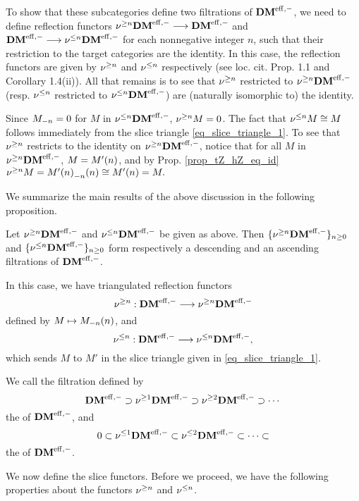 To show that these subcategories define two filtrations of 
$\DMeff$, we need to define reflection functors $\sgDM{n}\DMeff 
\to \DMeff$ and $\DMeff \to \slDM{n}\DMeff$ for each nonnegative 
integer $n$, such that their restriction to the target categories 
are the identity. In this case, the reflection functors are given 
by $\sgDM{n}$ and $\slDM{n}$ respectively (see loc. cit. Prop. 1.1 
and Corollary 1.4(ii)). All that remains is to see that $\sgDM{n}$ 
restricted to $\sgDM{n}\DMeff$ (resp. $\slDM{n}$ restricted to 
$\slDM{n}\DMeff$) are (naturally isomorphic to) the identity.

Since $\hZ[n]{M} = 0$ for $M$ in $\slDM{n}\DMeff$, $\sgDM{n} M = 
0$. The fact that $\slDM{n} M \cong M$ follows immediately from 
the slice triangle \eqref{eq_slice_triangle_1}. To see that 
$\sgDM{n}$ restricts to the identity on $\sgDM{n} \DMeff$, notice 
that for all $M$ in $\sgDM{n} \DMeff$, $M = \tZ[n]{M'}$, and by 
Prop. \ref{prop_tZ_hZ_eq_id} $\sgDM{n}M = 
\tZ[n]{\hZ[n]{\tZ[n]{M'}}} \cong \tZ[n]{M'} = M.$

We summarize the main results of the above discussion in the 
following proposition.

\begin{prop}\label{prop_slice_DMeff}
Let $\sgDM{n} \DMeff$ and $\slDM{n} \DMeff$ be given as above.
Then $\{\sgDM{n} \DMeff\}_{n \geq 0}$ and $\{\slDM{n} \DMeff\}_{n 
\geq 0}$ form respectively a descending and an ascending 
filtrations of $\DMeff$.

In this case, we have triangulated reflection functors 
\[
\sgDM{n}: \DMeff \to \sgDM{n}\DMeff
\] 
defined by $M \mapsto \tZ[n]{\hZ[n]{M}}$, and 
\[
\slDM{n}: \DMeff \to \slDM{n}\DMeff,
\]
which sends $M$ to $M'$ in the slice triangle given in 
\eqref{eq_slice_triangle_1}.
\end{prop}

\begin{defn}
We call the filtration defined by
\[
\DMeff \supset \sgDM{1}\DMeff \supset \sgDM{2}\DMeff \supset \cdots \\
\]
the  of $\DMeff$, and
\[
0 \subset \slDM{1}\DMeff \subset \slDM{2}\DMeff \subset \cdots \subset
\]
the  of $\DMeff$.
\end{defn}

We now define the slice functors. Before we proceed, we have the
following properties about the functors $\sgDM{n}$ and $\slDM{n}$.


